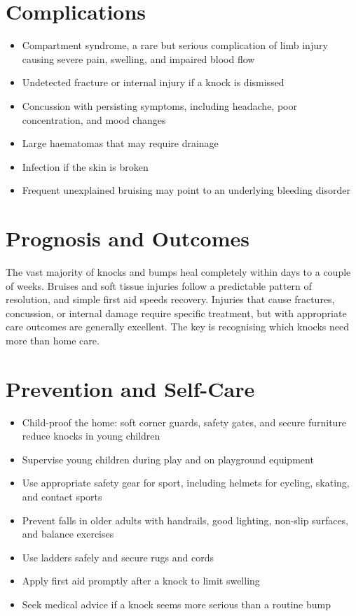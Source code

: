\section*{Complications}
\begin{itemize}
    \item Compartment syndrome, a rare but serious complication of limb injury causing severe pain, swelling, and impaired blood flow
    \item Undetected fracture or internal injury if a knock is dismissed
    \item Concussion with persisting symptoms, including headache, poor concentration, and mood changes
    \item Large haematomas that may require drainage
    \item Infection if the skin is broken
    \item Frequent unexplained bruising may point to an underlying bleeding disorder
\end{itemize}

\section*{Prognosis and Outcomes}
The vast majority of knocks and bumps heal completely within days to a couple of weeks. Bruises and soft tissue injuries follow a predictable pattern of resolution, and simple first aid speeds recovery. Injuries that cause fractures, concussion, or internal damage require specific treatment, but with appropriate care outcomes are generally excellent. The key is recognising which knocks need more than home care.

\section*{Prevention and Self-Care}
\begin{itemize}
    \item Child-proof the home: soft corner guards, safety gates, and secure furniture reduce knocks in young children
    \item Supervise young children during play and on playground equipment
    \item Use appropriate safety gear for sport, including helmets for cycling, skating, and contact sports
    \item Prevent falls in older adults with handrails, good lighting, non-slip surfaces, and balance exercises
    \item Use ladders safely and secure rugs and cords
    \item Apply first aid promptly after a knock to limit swelling
    \item Seek medical advice if a knock seems more serious than a routine bump
\end{itemize}

